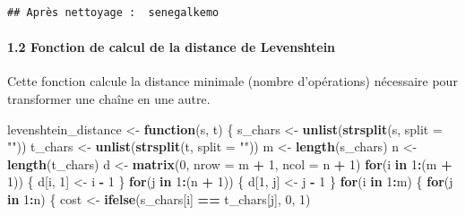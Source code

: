 \documentclass[
]{article}
\newenvironment{Shaded}{\begin{snugshade}}{\end{snugshade}}
\newcommand{\AttributeTok}[1]{\textcolor[rgb]{0.13,0.29,0.53}{#1}}
\newcommand{\ControlFlowTok}[1]{\textcolor[rgb]{0.13,0.29,0.53}{\textbf{#1}}}
\newcommand{\DecValTok}[1]{\textcolor[rgb]{0.00,0.00,0.81}{#1}}
\newcommand{\FunctionTok}[1]{\textcolor[rgb]{0.13,0.29,0.53}{\textbf{#1}}}
\newcommand{\NormalTok}[1]{#1}
\newcommand{\OtherTok}[1]{\textcolor[rgb]{0.56,0.35,0.01}{#1}}
\newcommand{\SpecialCharTok}[1]{\textcolor[rgb]{0.81,0.36,0.00}{\textbf{#1}}}
\newcommand{\StringTok}[1]{\textcolor[rgb]{0.31,0.60,0.02}{#1}}
\begin{document}
\begin{verbatim}
## Après nettoyage :  senegalkemo
\end{verbatim}

\hypertarget{fonction-de-calcul-de-la-distance-de-levenshtein}{%
\paragraph{1.2 Fonction de calcul de la distance de
Levenshtein}\label{fonction-de-calcul-de-la-distance-de-levenshtein}}

Cette fonction calcule la distance minimale (nombre d'opérations)
nécessaire pour transformer une chaîne en une autre.

\begin{Shaded}
\begin{Highlighting}[]
\NormalTok{levenshtein\_distance }\OtherTok{\textless{}{-}} \ControlFlowTok{function}\NormalTok{(s, t) \{}
\NormalTok{  s\_chars }\OtherTok{\textless{}{-}} \FunctionTok{unlist}\NormalTok{(}\FunctionTok{strsplit}\NormalTok{(s, }\AttributeTok{split =} \StringTok{""}\NormalTok{))}
\NormalTok{  t\_chars }\OtherTok{\textless{}{-}} \FunctionTok{unlist}\NormalTok{(}\FunctionTok{strsplit}\NormalTok{(t, }\AttributeTok{split =} \StringTok{""}\NormalTok{))}
\NormalTok{  m }\OtherTok{\textless{}{-}} \FunctionTok{length}\NormalTok{(s\_chars)}
\NormalTok{  n }\OtherTok{\textless{}{-}} \FunctionTok{length}\NormalTok{(t\_chars)}
\NormalTok{  d }\OtherTok{\textless{}{-}} \FunctionTok{matrix}\NormalTok{(}\DecValTok{0}\NormalTok{, }\AttributeTok{nrow =}\NormalTok{ m }\SpecialCharTok{+} \DecValTok{1}\NormalTok{, }\AttributeTok{ncol =}\NormalTok{ n }\SpecialCharTok{+} \DecValTok{1}\NormalTok{)}
  \ControlFlowTok{for}\NormalTok{(i }\ControlFlowTok{in} \DecValTok{1}\SpecialCharTok{:}\NormalTok{(m }\SpecialCharTok{+} \DecValTok{1}\NormalTok{)) \{ d[i, }\DecValTok{1}\NormalTok{] }\OtherTok{\textless{}{-}}\NormalTok{ i }\SpecialCharTok{{-}} \DecValTok{1}\NormalTok{ \}}
  \ControlFlowTok{for}\NormalTok{(j }\ControlFlowTok{in} \DecValTok{1}\SpecialCharTok{:}\NormalTok{(n }\SpecialCharTok{+} \DecValTok{1}\NormalTok{)) \{ d[}\DecValTok{1}\NormalTok{, j] }\OtherTok{\textless{}{-}}\NormalTok{ j }\SpecialCharTok{{-}} \DecValTok{1}\NormalTok{ \}}
  \ControlFlowTok{for}\NormalTok{(i }\ControlFlowTok{in} \DecValTok{1}\SpecialCharTok{:}\NormalTok{m) \{}
    \ControlFlowTok{for}\NormalTok{(j }\ControlFlowTok{in} \DecValTok{1}\SpecialCharTok{:}\NormalTok{n) \{}
\NormalTok{      cost }\OtherTok{\textless{}{-}} \FunctionTok{ifelse}\NormalTok{(s\_chars[i] }\SpecialCharTok{==}\NormalTok{ t\_chars[j], }\DecValTok{0}\NormalTok{, }\DecValTok{1}\NormalTok{)}

\end{Highlighting}
\end{Shaded}
\end{document}
